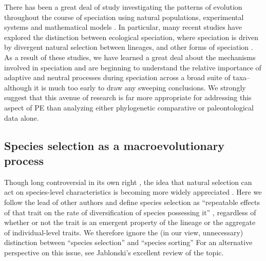 There has been a great deal of study investigating the patterns of evolution throughout the course of speciation using natural populations, experimental systems and mathematical models \citep[][and references within]{Schluter2000, CoyneOrr, Gavrilets2004, Rundle2005, Doebeli2011, Nosil2012}.  In particular, many recent studies have explored the distinction between ecological speciation, where speciation is driven by divergent natural selection between lineages, and other forms of speciation \citep[e.g., Bateson-Dobzhansky-Muller incompatibilities, speciation driven by sexual selection, etc.; reviewed in ][]{Nosil2012}. As a result of these studies, we have learned a great deal about the mechanisms involved in speciation and are beginning to understand the relative importance of adaptive and neutral processes during speciation across a broad suite of taxa--although it is much too early to draw any sweeping conclusions. We strongly suggest that this avenue of research is far more appropriate for addressing this aspect of PE than analyzing either phylogenetic comparative or paleontological data alone. 

\subsection{Species selection as a macroevolutionary process}

Though long controversial in its own right \citep{FitzJohnthesis}, the idea that natural selection can act on species-level characteristics is becoming more widely appreciated \citep{CoyneOrr, Jablonski2008, RaboskyMcCune2010, FitzJohnthesis}. Here we follow the lead of other authors \citep{Williams1992, CoyneOrr, RaboskyMcCune2010} and define species selection as  ``repeatable effects of that trait on the rate of diversification of species possessing it'' \citep[][p. 444]{CoyneOrr}, regardless of whether or not the trait is an emergent property of the lineage or the aggregate of individual-level traits. We therefore ignore the (in our view, unnecessary) distinction between ``species selection'' and ``species sorting'' \citep[\textit{sensu}][]{GouldVrba1986} For an alternative perspective on this issue, see Jablonski's excellent review \citeyearpar{Jablonski2008} of the topic.

